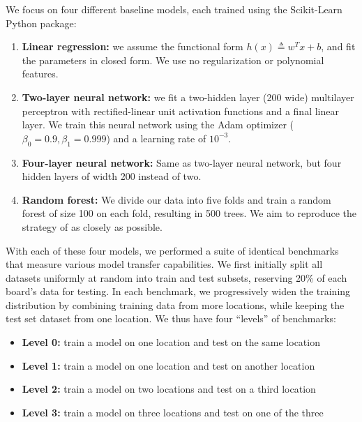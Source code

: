 \documentclass[journal abbreviation, manuscript]{copernicus}
\begin{document}
We focus on four different baseline models, each trained using the Scikit-Learn Python package: 
\begin{enumerate}
    \item \textbf{Linear regression:} we assume the functional form $h(x) \triangleq w^T x + b$, and fit the parameters in closed form. We use no regularization or polynomial features.
    \item \textbf{Two-layer neural network:} we fit a two-hidden layer (200 wide) multilayer perceptron with rectified-linear unit activation functions and a final linear layer. We train this neural network using the Adam optimizer ($\beta_0 = 0.9, \beta_1 = 0.999$) and a learning rate of $10^{-3}$.
    \item \textbf{Four-layer neural network:} Same as two-layer neural network, but four hidden layers of width 200 instead of two.
    \item \textbf{Random forest:} We divide our data into five folds and train a random forest of size 100 on each fold, resulting in 500 trees. We aim to reproduce the strategy of \citet{Zimmerman2018} as closely as possible.
\end{enumerate}
With each of these four models, we performed a suite of identical benchmarks that measure various model transfer capabilities. We first initially split all datasets uniformly at random into train and test subsets, reserving 20\% of each board's data for testing.
In each benchmark, we progressively widen the training distribution by combining training data from more locations, while keeping the test set dataset from one location. We thus have four ``levels'' of benchmarks:
\begin{itemize}
    \item \textbf{Level 0:} train a model on one location and test on the same location
    \item \textbf{Level 1:} train a model on one location and test on another location
    \item \textbf{Level 2:} train a model on two locations and test on a third location 
    \item \textbf{Level 3:} train a model on three locations and test on one of the three
\end{itemize}
\end{document}
